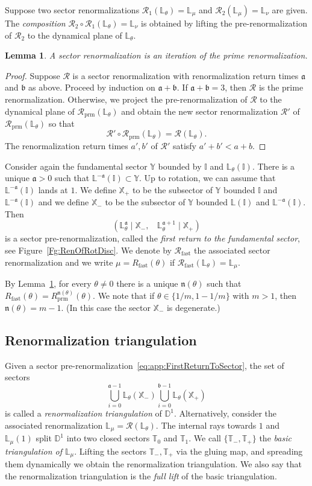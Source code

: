 \documentclass[]{amsart}
\renewcommand{\sp}{{\ \ }}
\newcommand\RR{\mathcal{R}}
\newcommand\cRR{R}%
\newcommand\prm{{\operatorname{prm}}}
\newcommand\RRc{\mathcal{R}_{\prm}}
\newcommand\cRRc{R_{\prm}}%
\renewcommand{\aa}{{\mathfrak{a}}}
\newcommand{\bb}{{\mathfrak{b}}}
\newcommand{\nn}{\mathfrak{n}}
\newcommand{\Disk}{\mathbb{D}^1}
\newcommand{\Lbb}{{\mathbb L}}
\newcommand{\Ibb}{{\mathbb I}}
\newcommand{\Sbb}{{\mathbb X}}
\newcommand{\Sby}{{\mathbb Y}}
\newcommand{\Sbz}{{\mathbb T}}
\newtheorem{lem}[thm]{Lemma}
\theoremstyle{remark}
\numberwithin{equation}{section}
\theoremstyle{definition}
\newcommand{\fast}{{\mathrm{fast}}}
\begin{document}
Suppose two sector renormalizations $\RR_1(\Lbb_\theta)=\Lbb_\mu$ and $\RR_2(\Lbb_\mu)=\Lbb_\nu$ are given. The \emph{composition} $\RR_2\circ \RR_1(\Lbb_\theta)=\Lbb_\nu$ is obtained by lifting the pre-renormalization of $\RR_2$ to the dynamical plane of $\Lbb_\theta$.

\begin{lem}
\label{lem:SectRen is prime power}
A sector renormalization is an iteration of the prime renormalization.
\end{lem}
\begin{proof}
Suppose $\RR$ is a sector renormalization with renormalization return times $\aa$ and $\bb$ as above. Proceed by induction on $\aa+\bb$. If $\aa+\bb=3$, then $\RR$ is the prime renormalization. Otherwise, we project the pre-renormalization of $\RR$ to the dynamical plane of $\RRc(\Lbb_\theta)$ and obtain the new sector renormalization $\RR'$ of $\RRc(\Lbb_\theta)$ so that 
\[\RR' \circ \RRc(\Lbb_\theta)=\RR(\Lbb_\theta).\]
The renormalization return times $a',b'$ of $\RR'$ satisfy $a'+b'< a+b$.
\end{proof}

Consider again the fundamental sector $\Sby$ bounded by $\Ibb$ and $\Lbb_\theta(\Ibb)$. There is a unique $\aa>0$
 such that $\Lbb^{-\aa}(\Ibb)\subset \Sby$. Up to rotation, we can assume that $\Lbb^{-\aa}(\Ibb)$ lands at $1$. We define $\Sbb_+$ to be the subsector of $\Sby$ bounded $\Ibb$ and $\Lbb^{-\aa}(\Ibb)$ and we define  $\Sbb_-$ to be the subsector of $\Sby$ bounded $\Lbb(\Ibb)$ and $\Lbb^{-\aa}(\Ibb)$. Then
 \[\left(\Lbb_\theta ^\aa\mid \Sbb_- , \sp\sp \Lbb_\theta ^{\aa+1}\mid \Sbb_+\right)\]
is a sector pre-renormalization, called the \emph{first return to the fundamental sector}, see Figure~\ref{Fg:RenOfRotDisc}. We denote by $\RR_{\fast}$ the associated sector renormalization and we write $\mu=\cRR_\fast(\theta)$ if $\RR_{\fast}(\Lbb_\theta)=\Lbb_\mu$. 

By Lemma~\ref{lem:SectRen is prime power}, for every $\theta\not=0$ there is a unique $\nn(\theta)$ such that $\cRR_\fast(\theta)=\cRRc^{\nn(\theta)}(\theta)$. We note that if $\theta\in\{1/m, 1-1/m\}$ with $m>1$, then $\nn(\theta)=m-1$. (In this case the sector $\Sbb_-$ is degenerate.)



\subsection{Renormalization triangulation}
Given a sector pre-renormalization~\eqref{eq:app:FirstReturnToSector}, the set of sectors \[\bigcup_{i=0}^{\aa-1} \Lbb_\theta (\Sbb_-)\bigcup_{i=0}^{\bb-1} \Lbb_\theta(\Sbb_+) \]
is called a \emph{renormalization triangulation} of $\Disk$. Alternatively, consider the associated renormalization $\Lbb_{\mu}=\RR(\Lbb_\theta)$. The internal rays towards $1$ and $\Lbb_{\mu}(1)$ split $\Disk$ into two closed sectors $\Sbz_0$ and $\Sbz_{1}$. We call $\{\Sbz_-,  \Sbz_{+}\}$ the \emph{basic triangulation of $\Lbb_\mu$}. Lifting the sectors $\Sbz_-,  \Sbz_{+}$ via the gluing map, and spreading them dynamically we obtain the renormalization triangulation. We also say that  the renormalization triangulation is the \emph{full lift} of the basic triangulation.   
\end{document}
